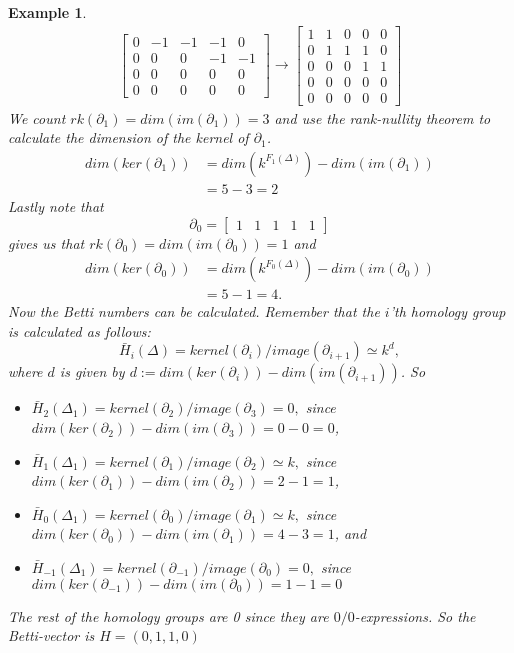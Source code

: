 \documentclass[11pt,a4paper,twoside]{report}
\newtheorem{myex}[mythm]{Example}
\begin{document}
\begin{myex}
\begin{align*}
\begin{bmatrix}
0 & -1 & -1 & -1 & 0\\
0 & 0 & 0 & -1 & -1\\
0 & 0 & 0 & 0 & 0\\
0 & 0 & 0 & 0 & 0
\end{bmatrix}
\to
\begin{bmatrix}
1 & 1 & 0 & 0 & 0\\
0 & 1 & 1 & 1 & 0\\
0 & 0 & 0 & 1 & 1\\
0 & 0 & 0 & 0 & 0\\
0 & 0 & 0 & 0 & 0
\end{bmatrix}
\end{align*}
We count $rk(\partial_1)=dim(im(\partial_1))=3$ and use the rank-nullity theorem to calculate the dimension of the kernel of $\partial_1$.
\begin{align*}
dim(ker(\partial_1))&=dim(k^{F_1(\Delta)})-dim(im(\partial_1))\\
&=5-3= 2
\end{align*}
Lastly note that 
\begin{equation*}
\partial_0=
\begin{bmatrix}
1 & 1 & 1 & 1 & 1 
\end{bmatrix}
\end{equation*}
gives us that $rk(\partial_0)=dim(im(\partial_0))=1$ and 
\begin{align*}
dim(ker(\partial_0))&=dim(k^{F_0(\Delta)})-dim(im(\partial_0))\\
&=5-1= 4.
\end{align*}
Now the Betti numbers can be calculated. Remember that the $i$'th homology group is calculated as follows:
\begin{equation*}
\bar{H}_i(\Delta)=kernel(\partial_i)/image(\partial_{i+1})\simeq k^d,
\end{equation*}
where $d$ is given by $d:=dim(ker(\partial_i))-dim(im(\partial_{i+1}))$. So 
\begin{itemize}
\item$\bar{H}_2(\Delta_1)=kernel(\partial_2)/image(\partial_{3})=0,$
since $dim(ker(\partial_2))-dim(im(\partial_{3}))=0-0=0$,
\item$\bar{H}_1(\Delta_1)=kernel(\partial_1)/image(\partial_{2})\simeq k,$ since $dim(ker(\partial_1))-dim(im(\partial_{2}))=2-1=1$,
\item$\bar{H}_0(\Delta_1)=kernel(\partial_0)/image(\partial_{1})\simeq k,$
since $dim(ker(\partial_0))-dim(im(\partial_{1}))=4-3=1$, and 
\item$\bar{H}_{-1}(\Delta_1)=kernel(\partial_{-1})/image(\partial_{0})=0,$
since $dim(ker(\partial_{-1}))-dim(im(\partial_{0}))=1-1=0$
\end{itemize}
The rest of the homology groups are 0 since they are $0/0$-expressions.
So the Betti-vector is $H=(0,1,1,0)$
\end{myex}
\end{document}
